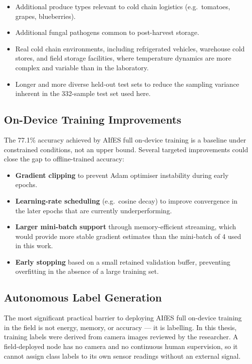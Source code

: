 \begin{itemize}
    \item Additional produce types relevant to cold chain logistics (e.g.\ tomatoes, grapes, blueberries).
    \item Additional fungal pathogens common to post-harvest storage.
    \item Real cold chain environments, including refrigerated vehicles, warehouse cold stores, and field storage facilities, where temperature dynamics are more complex and variable than in the laboratory.
    \item Longer and more diverse held-out test sets to reduce the sampling variance inherent in the 332-sample test set used here.
\end{itemize}

\subsection{On-Device Training Improvements}

The 77.1\% accuracy achieved by AIfES full on-device training is a baseline under constrained conditions, not an upper bound. Several targeted improvements could close the gap to offline-trained accuracy:

\begin{itemize}
    \item \textbf{Gradient clipping} to prevent Adam optimiser instability during early epochs.
    \item \textbf{Learning-rate scheduling} (e.g.\ cosine decay) to improve convergence in the later epochs that are currently underperforming.
    \item \textbf{Larger mini-batch support} through memory-efficient streaming, which would provide more stable gradient estimates than the mini-batch of 4 used in this work.
    \item \textbf{Early stopping} based on a small retained validation buffer, preventing overfitting in the absence of a large training set.
\end{itemize}

\subsection{Autonomous Label Generation}

The most significant practical barrier to deploying AIfES full on-device training in the field is not energy, memory, or accuracy --- it is labelling. In this thesis, training labels were derived from camera images reviewed by the researcher. A field-deployed node has no camera and no continuous human supervision, so it cannot assign class labels to its own sensor readings without an external signal.

